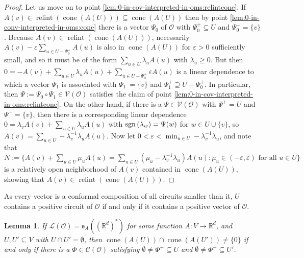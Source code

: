 \documentclass[a4paper,11pt,reqno, english]{amsart}
\newtheorem{lemma}[theorem]{Lemma}
\theoremstyle{definition}
\theoremstyle{remark}
\newcommand\R{\mathbb R}
\newcommand\sgn{{\rm sgn\,}}
\DeclareMathOperator{\cone}{\mathrm{cone}}
\DeclareMathOperator{\relint}{\mathrm{relint}}
\begin{document}
\begin{proof}
    Let us move on to point \ref{lem:0-in-cov-interpreted-in-oms:relintcone}. If $A(v)\in\relint(\cone(A(U)))\subseteq\cone(A(U))$ then by point \ref{lem:0-in-conv-interpreted-in-oms:cone} there is a vector $\Psi_0$ of $\mathscr{O}$ with $\Psi_0^+\subseteq U$ and $\Psi_0^-=\{v\}$. Because $A(v)\in\relint(\cone(A(U)))$, necessarily $A(v)-\varepsilon\sum_{u\in U-\Psi_0^+}A(u)$ is also in $\cone(A(U))$ for $\varepsilon>0$ sufficiently small, and so it must be of the form $\sum_{u\in U}\lambda_uA(u)$ with $\lambda_u\geq 0$. But then $0=-A(v)+\sum_{u\in U}\lambda_uA(u)+\sum_{u\in U-\Psi_0^+}\varepsilon A(u)$ is a linear dependence to which a vector $\Psi_1$ is associated with $\Psi_1^-=\{v\}$ and $\Psi_1^+\supseteq U-\Psi_0^+$. In particular, then $\Psi:=\Psi_0\circ\Psi_1\in\mathscr{V}(\mathscr{O})$ satisfies the claim of point \ref{lem:0-in-cov-interpreted-in-oms:relintcone}. On the other hand, if there is a $\Psi\in\mathscr{V}(\mathscr{O})$ with $\Psi^+=U$ and $\Psi^-=\{v\}$, then there is a corresponding linear dependence $0=\lambda_vA(v)+\sum_{u\in U}\lambda_uA(u)$ with $\sgn(\lambda_w)=\Psi(w)$ for $w\in U\cup\{v\}$, so $A(v)=\sum_{u\in U}-\lambda_v^{-1}\lambda_uA(u)$. Now let $0<\varepsilon<\min_{u\in U}-\lambda_v^{-1}\lambda_u$, and note that 
    $
        N:=\{A(v)+\sum_{u\in U}\mu_uA(u)=\sum_{u\in U}(\mu_u-\lambda_v^{-1}\lambda_u)A(u):\mu_u\in(-\varepsilon,\varepsilon)\text{~for all~}u\in U\}
    $
    is a relatively open neighborhood of $A(v)$ contained in $\cone(A(U))$, showing that $A(v)\in\relint(\cone(A(U)))$.
\end{proof}
As every vector is a conformal composition of all circuits smaller than it, $U$ contains a positive circuit of $\mathscr{O}$ if and only if it contains a positive vector of $\mathscr{O}$.
\begin{lemma}\label{lem:intersection-of-cones-in-oms}
    If $\mathscr{L}(\mathscr{O})=\mathfrak{s}_A((\R^d)^*)$ for some function $A\colon V\to\R^d$, and $U,U'\subseteq V$ with $U\cap U'=\emptyset$, then $\cone(A(U))\cap\cone(A(U'))\neq\{0\}$ if and only if there is a $\Phi\in\mathscr{C}(\mathscr{O})$ satisfying $\emptyset\neq\Phi^+\subseteq U$ and $\emptyset\neq\Phi^-\subseteq U'$.
\end{lemma}
\end{document}
